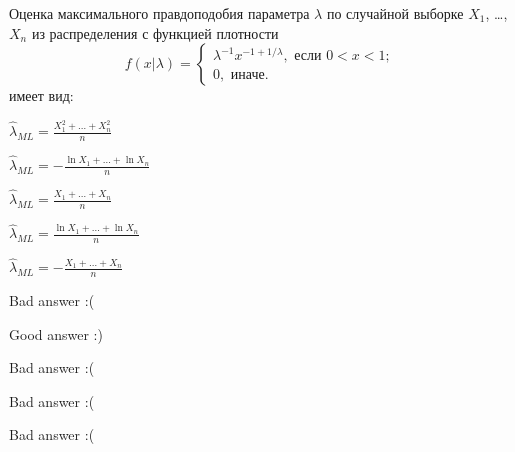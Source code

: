 
\begin{question}
Оценка максимального правдоподобия параметра \(\lambda\) по случайной выборке \(X_1\), \ldots, \(X_n\) из распределения с функцией плотности
\[
f(x|\lambda ) = \begin{cases}
\lambda^{-1} x^{- 1 + 1/\lambda},
\text{ если }0 < x < 1; \\
0, \text{ иначе.}
\end{cases}
\]
имеет вид:
\begin{answerlist}
  \item \(\hat\lambda_{ML} = \frac{X_1^2 + \ldots + X_n^2}{n}\)
  \item \(\hat\lambda_{ML} = -\frac{\ln X_1 + \ldots + \ln X_n}{n}\)
  \item \(\hat\lambda_{ML} = \frac{X_1 + \ldots + X_n}{n}\)
  \item \(\hat\lambda_{ML} = \frac{\ln X_1 + \ldots + \ln X_n}{n}\)
  \item \(\hat\lambda_{ML} = -\frac{X_1 + \ldots + X_n}{n}\)
\end{answerlist}
\end{question}

\begin{solution}
\begin{answerlist}
  \item Bad answer :(
  \item Good answer :)
  \item Bad answer :(
  \item Bad answer :(
  \item Bad answer :(
\end{answerlist}
\end{solution}

